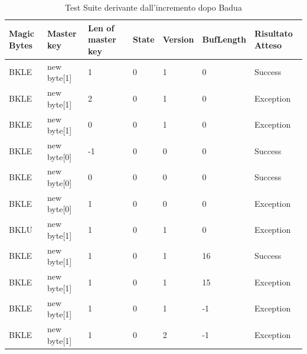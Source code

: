 \documentclass[12pt, a4paper]{article}
\begin{document}
\begin{table}[ht]
  \centering
  \caption[Test Suite - Category Partition]{Test Suite derivante dall'incremento dopo Badua}
  \begin{tabular}{|l|l|l|l|l|l|l|}
    \hline
    \textbf{Magic Bytes} & \textbf{Master key} & \textbf{Len of master key}  & \textbf{State} & \textbf{Version} & \textbf{BufLength} & \textbf{Risultato Atteso} \\
    \hline
    BKLE & new byte[1] & 1 & 0 & 1 & 0 & Success \\
    BKLE & new byte[1] & 2 & 0 & 1 & 0 & Exception \\
    BKLE & new byte[1] & 0 & 0 & 1 & 0 & Exception \\
    BKLE & new byte[0] & -1 & 0 & 0 & 0 & Success \\
    BKLE & new byte[0] & 0 & 0 & 0 & 0 & Success \\
    BKLE & new byte[0] & 1 & 0 & 0 & 0 & Exception \\
    BKLU & new byte[1] & 1 & 0 & 1 & 0 & Exception \\
    BKLE & new byte[1] & 1 & 0 & 1 & 16 & Success \\
    BKLE & new byte[1] & 1 & 0 & 1 & 15 & Exception \\
    BKLE & new byte[1] & 1 & 0 & 1 & -1 & Exception \\
    BKLE & new byte[1] & 1 & 0 & 2 & -1 & Exception \\
    \hline
  \end{tabular}
  \label{tab:ADF1ReadHeader}
\end{table}




\end{document}
